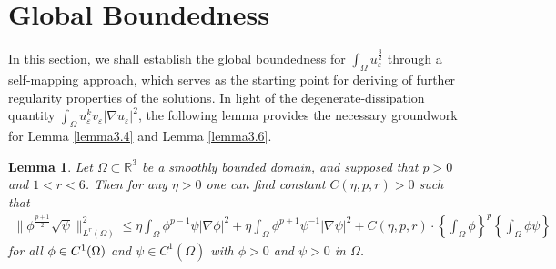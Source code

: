 \documentclass[12pt]{article}
\theoremstyle{plain}
\newtheorem{lemma}{Lemma}[section]
\theoremstyle{definition}
\numberwithin{equation}{section}
\begin{document}
\section{Global Boundedness}
In this section, we shall establish the global boundedness for $\int_\Omega u_\varepsilon^{\frac3 2}$ through a self-mapping approach, which serves as the starting point for  deriving of  further regularity properties of the solutions.  In light of the degenerate-dissipation quantity $\int_{\Omega} u_\varepsilon^{k} v_\varepsilon |\nabla u_\varepsilon|^2$,
 the following lemma provides the necessary groundwork for Lemma \ref{lemma3.4} and Lemma \ref{lemma3.6}.  %
\begin{lemma}\label{lemma3.1}
Let $\Omega \subset \mathbb R^3$ be  a smoothly bounded domain, and supposed that $p>0$ and $1< r<6$. Then for any $\eta>0$ one can find constant $C(\eta,p,r)>0$
such that
\begin{align}\label{3.1}
    \|\phi^{\frac{p+1}{2}}\sqrt{\psi}\|^2_{L^{r}(\Omega)}\leq \eta \int_{\Omega}\phi^{p-1}\psi|\nabla \phi|^2+\eta
    \int_{\Omega}\phi^{p+1}\psi^{-1}|\nabla \psi|^2+C(\eta, p,r)\cdot
    \left\{\int_{\Omega}\phi\right\}^{p}\left\{\int_{\Omega}\phi\psi\right\}
\end{align}for all $\phi\in C^1(\Bar{\Omega})$ and $\psi\in C^1(\overline{\Omega})$  with $\phi>0$ and $\psi>0$ in $\overline{\Omega}$.
\end{lemma}
\end{document}
